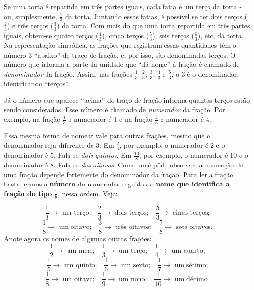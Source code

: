 Se uma torta é repartida em três partes iguais, cada fatia é um terço da torta - ou, simplesmente, $\frac{1}{3}$ da torta. Juntando essas fatias, é possível se ter dois terços ($\frac{2}{3}$) e três terços ($\frac{3}{3}$) da torta. Com mais do que uma torta repartida em três partes iguais, obtem-se quatro terços ($\frac{4}{3}$), cinco terços ($\frac{5}{3}$), seis terços ($\frac{6}{3}$), etc, da torta. Na representação simbólica, as frações que registram essas quantidades têm o número 3 ``abaixo'' do traço de fração, e, por isso, são denominadas terços. O número que informa a parte da unidade que ``dá nome'' à fração é chamado de {\it denominador} da fração. Assim, nas frações $\frac{1}{3}$, $\frac{2}{3}$, $\frac{3}{3}$,  $\frac{4}{3}$ e $\frac{5}{3}$, o 3 é o denominador, identificando ``terços''. 

Já o número que aparece ``acima'' do traço de fração informa quantos terços estão sendo considerados. Esse número é chamado de {\it numerador} da fração. Por exemplo, na fração $\frac{1}{3}$ o numerador é 1 e na fração $\frac{4}{3}$ o numerador é 4.

Essa mesma forma de nomear vale para outras frações, mesmo que o denominador seja diferente de 3:\mbox{} \newline 
Em $\frac{2}{5}$, por exemplo, o numerador é 2 e o denominador é 5. Fala-se {\it dois quintos}.\mbox{} \newline 
Em $\frac{10}{8}$, por exemplo, o numerador é 10 e o denominador é 8. Fala-se {\it dez oitavos}. \mbox{} \newline 
Como você pôde observar, a nomeação de uma fração depende fortemente do denominador da fração. Para ler a fração basta lermos o {\bf número} do numerador seguido do {\bf nome que identifica a fração do tipo} $\frac{1}{b}$, nessa ordem. Veja:

$$\frac{1}{3}\rightarrow \text{ um terço;} \quad \frac{2}{3}\rightarrow \text{ dois terços;} \quad \frac{5}{3}\rightarrow \text{ cinco terços;}$$
$$\frac{1}{8}\rightarrow \text{ um oitavo;} \quad \frac{3}{8}\rightarrow \text{ três oitavos;} \quad \frac{7}{8}\rightarrow \text{ sete oitavos.}$$
Anote agora os nomes de algumas outras frações:
$$\frac{1}{2}\rightarrow \text{  um meio;} \quad \frac{1}{3}\rightarrow\text{  um terço;} \quad \frac{1}{4}\rightarrow\text{  um quarto;}$$
$$\frac{1}{5}\rightarrow\text{  um quinto;}\quad \frac{1}{6}\rightarrow\text{  um sexto;} \quad \frac{1}{7}\rightarrow\text{  um sétimo;}$$
$$\frac{1}{8}\rightarrow\text{  um oitavo;}\quad \frac{1}{9}\rightarrow\text{  um nono;}\quad \frac{1}{10}\rightarrow\text{  um décimo.}$$

